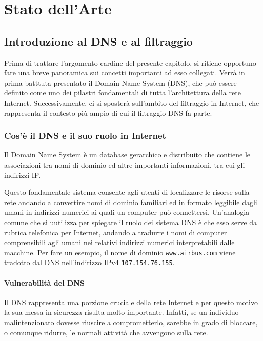 \chapter{Stato dell'Arte}

\section{Introduzione al DNS e al filtraggio}
Prima di trattare l'argomento cardine del presente capitolo, si ritiene opportuno fare una breve panoramica sui concetti importanti ad esso collegati. Verrà in prima batttuta presentato il Domain Name System (DNS), che può essere definito come uno dei pilastri fondamentali di tutta l'architettura della rete Internet. Successivamente, ci si sposterà sull'ambito del filtraggio in Internet, che rappresenta il contesto più ampio di cui il filtraggio DNS fa parte.

\subsection{Cos'è il DNS e il suo ruolo in Internet}
Il Domain Name System è un database gerarchico e distribuito che contiene le associazioni tra nomi di dominio ed altre importanti informazioni, tra cui gli indirizzi IP.

Questo fondamentale sistema consente agli utenti di localizzare le risorse sulla rete andando a convertire nomi di dominio familiari ed in formato leggibile dagli umani in indirizzi numerici ai quali un computer può connettersi. Un'analogia comune che si uutilizza per spiegare il ruolo dei sistema DNS è che esso serve da rubrica telefonica per Internet, andando a tradurre i nomi di computer comprensibili agli umani nei relativi indirizzi numerici interpretabili dalle macchine. Per fare un esempio, il nome di dominio \texttt{www.airbus.com} viene tradotto dal DNS nell'indirizzo IPv4 \texttt{107.154.76.155}.

\subsubsection{Vulnerabilità del DNS}
Il DNS rappresenta una porzione cruciale della rete Internet e per questo motivo la sua messa in sicurezza risulta molto importante. Infatti, se un individuo malintenzionato dovesse riuscire a comprometterlo, sarebbe in grado di bloccare, o comunque ridurre, le normali attività che avvengono sulla rete.

